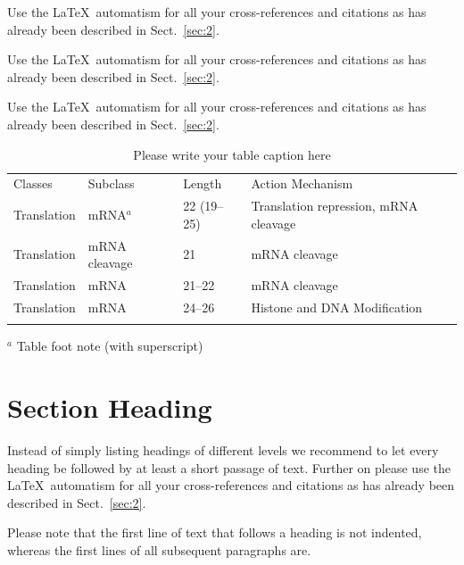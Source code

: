 \documentclass[graybox]{SNmult}
\begin{document}
 Use the \LaTeX\ automatism for all your cross-references and citations as has already been described in Sect.~\ref{sec:2}.

 Use the \LaTeX\ automatism for all your cross-refer\-ences and citations as has already been described in Sect.~\ref{sec:2}.

 Use the \LaTeX\ automatism for all your cross-refer\-ences and citations as has already been described in Sect.~\ref{sec:2}.
%
%
\begin{table}[!t]
\caption{Please write your table caption here}
\label{tab:1}       %
%
%
\begin{tabular}{p{2cm}p{2.4cm}p{2cm}p{4.9cm}}
\hline\noalign{\smallskip}
Classes & Subclass & Length & Action Mechanism  \\
\noalign{\smallskip}\svhline\noalign{\smallskip}
Translation & mRNA$^a$  & 22 (19--25) & Translation repression, mRNA cleavage\\
Translation & mRNA cleavage & 21 & mRNA cleavage\\
Translation & mRNA  & 21--22 & mRNA cleavage\\
Translation & mRNA  & 24--26 & Histone and DNA Modification\\
\noalign{\smallskip}\hline\noalign{\smallskip}
\end{tabular}
$^a$ Table foot note (with superscript)
\end{table}
%
\section{Section Heading}
\label{sec:3}
Instead of simply listing headings of different levels we recommend to let every heading be followed by at least a short passage of text.  Further on please use the \LaTeX\ automatism for all your cross-references and citations as has already been described in Sect.~\ref{sec:2}.

Please note that the first line of text that follows a heading is not indented, whereas the first lines of all subsequent paragraphs are.
\end{document}
